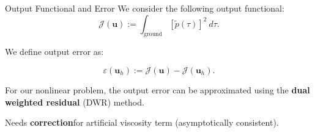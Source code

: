 \documentclass{beamer}
\newcounter{sectionframes}
\newcommand{\setsectionframes}[1]{%
  \setcounter{sectionframes}{#1}%
}
\newcounter{sectionframecount}
\begin{document}
\setsectionframes{5}

\begin{frame}[t]{Output Functional and Error}
  We consider the following output functional:
  \begin{equation}
    \mathcal{J}(\boldsymbol{u}) := \int_{\text{ground}} [\tilde{p}(\tau)]^2~d\tau.
    \label{e:output_functional}
  \end{equation}

{
\vspace{10pt}
We define output error as:

\begin{equation}
  \varepsilon (\boldsymbol{u}_h) := \mathcal{J}(\boldsymbol{u}) - \mathcal{J}(\boldsymbol{u}_h).
\end{equation}

\vspace{8pt}
For our nonlinear problem, the output error can be approximated using the \textbf{dual weighted residual} (DWR) method.
}

{
\vspace{10pt}
Needs \textbf{correction}\footnotemark for artificial viscosity term (asymptotically consistent).
}
\end{frame}

\end{document}
